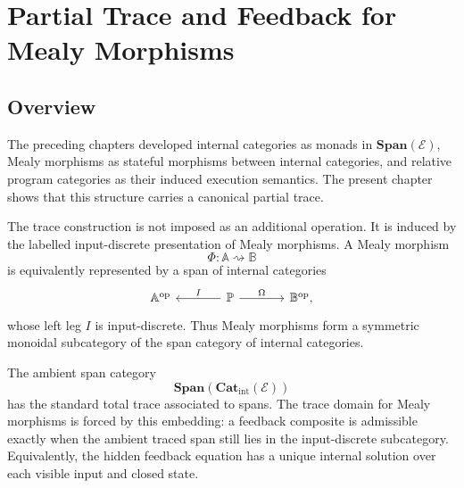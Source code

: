 \chapter{Partial Trace and Feedback for Mealy Morphisms}
\label{ch:partial-trace-feedback-mealy}

\section{Overview}
\label{sec:partial-trace-feedback-overview}

The preceding chapters developed internal categories as monads in
\(\mathbf{Span}(\mathcal E)\), Mealy morphisms as stateful morphisms between
internal categories, and relative program categories as their induced execution
semantics.  The present chapter shows that this structure carries a canonical
partial trace.

The trace construction is not imposed as an additional operation.  It is
induced by the labelled input-discrete presentation of Mealy morphisms.  A
Mealy morphism
\[
\Phi:\mathbb A\rightsquigarrow\mathbb B
\]
is equivalently represented by a span of internal categories
\[
\begin{tikzcd}[column sep=large]
\mathbb A^{\mathrm{op}}
&
\mathbb P
  \arrow[l, "I"']
  \arrow[r, "\Omega"]
&
\mathbb B^{\mathrm{op}},
\end{tikzcd}
\]
whose left leg \(I\) is input-discrete.  Thus Mealy morphisms form a symmetric
monoidal subcategory of the span category of internal categories.

The ambient span category
\[
\mathbf{Span}(\mathbf{Cat}_{\mathrm{int}}(\mathcal E))
\]
has the standard total trace associated to spans.  The trace domain for Mealy
morphisms is forced by this embedding: a feedback composite is admissible
exactly when the ambient traced span still lies in the input-discrete
subcategory.  Equivalently, the hidden feedback equation has a unique internal
solution over each visible input and closed state.

